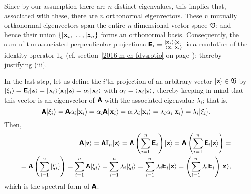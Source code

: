 {Since by our assumption there are $n$ distinct eigenvalues, this implies that, associated with these,
there are $n$ orthonormal eigenvectors.
These $n$ mutually orthonormal eigenvectors
span the entire $n$-dimensional vector space $\frak V$;
and hence their union $\{ \vert {\bf x}_i, \ldots , \vert {\bf x}_n\}$ forms an orthonormal basis.
Consequently, the sum of the associated perpendicular projections
$\textsf{\textbf{E}}_i = \frac{\vert {\bf x}_i \rangle \langle {\bf x}_i \vert}{\langle {\bf x}_i \vert {\bf x}_i  \rangle}$
is a resolution of the identity operator ${\Bbb I}_n$
(cf. section~\ref{2016-m-ch-fdvsrotio} on page~\pageref{2016-m-ch-fdvsrotio}); thereby justifying (iii).

In the last step, let us define the $i$'th projection of an arbitrary vector $\vert {\bf z}\rangle \in \frak V$
by
$
\vert {\xi}_i \rangle =  \textsf{\textbf{E}}_i  \vert  {\bf z} \rangle
=
\vert  {\bf x}_i \rangle \langle  {\bf x}_i   \vert  {\bf z} \rangle
= \alpha_i \vert  {\bf x}_i \rangle
$ with $
\alpha_i = \langle  {\bf x}_i   \vert  {\bf z} \rangle
$,
thereby keeping in mind that this vector
is an eigenvector of $\textsf{\textbf{A}}$  with the associated eigenvalue $\lambda_i$; that is,
\begin{equation}
\textsf{\textbf{A}} \vert {\xi}_i  \rangle
= \textsf{\textbf{A}}\alpha_i \vert  {\bf x}_i \rangle
= \alpha_i \textsf{\textbf{A}} \vert  {\bf x}_i \rangle
= \alpha_i \lambda_i \vert  {\bf x}_i  \rangle
= \lambda_i \alpha_i \vert  {\bf x}_i  \rangle
= \lambda_i \vert {\xi}_i\rangle .
\end{equation}
Then,
\begin{equation}
\begin{split}
\textsf{\textbf{A}} \vert {\bf z} \rangle =
\textsf{\textbf{A}} {\Bbb I}_n \vert {\bf z} \rangle=
\textsf{\textbf{A}} \left(\sum_{i=1}^n \textsf{\textbf{E}}_i\right) \vert {\bf z}\rangle  =
\textsf{\textbf{A}} \left(\sum_{i=1}^n \textsf{\textbf{E}}_i \vert {\bf z}\rangle \right) =     \\
=
\textsf{\textbf{A}} \left(\sum_{i=1}^n \vert {\xi}_i\rangle \right) =
 \sum_{i=1}^n \textsf{\textbf{A}} \vert {\xi}_i\rangle   =
 \sum_{i=1}^n \lambda_i \vert {\xi}_i \rangle   =
 \sum_{i=1}^n \lambda_i \textsf{\textbf{E}}_i   \vert {\bf z}\rangle =
\left( \sum_{i=1}^n \lambda_i \textsf{\textbf{E}}_i \right) \vert {\bf z}\rangle ,
\end{split}
\end{equation}
which is the spectral form of $\textsf{\textbf{A}}$.
\eproof
}

